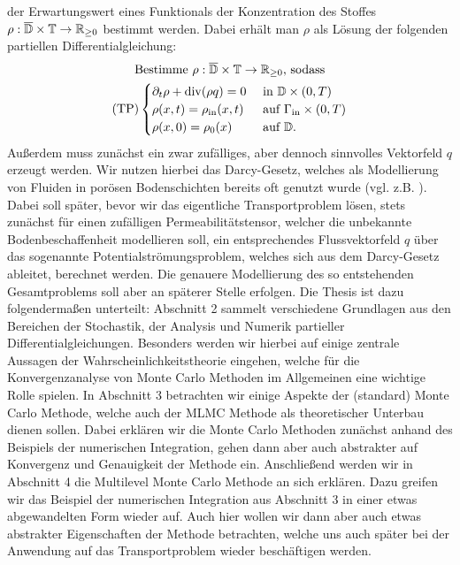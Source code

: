 der Erwartungswert eines Funktionals der  Konzentration des Stoffes $\rho: \overline{\mathbb{D}} \times \mathbb{T}  \rightarrow \mathbb{R}_{\geq0}$ bestimmt werden. Dabei erhält man $\rho$ als Lösung der folgenden partiellen Differentialgleichung:
\begin{gather*}
\text{Bestimme } \rho: \overline{\mathbb{D}} \times \mathbb{T} \to \mathbb{R}_{\geq 0} \text{, sodass}\\
(\text{TP})
\begin{cases}
\partial_t \rho + \operatorname{div}(\rho q) = 0 &\text{ in } \mathbb{D} \times (0,T)\\
\rho(x,t) = \rho_{\text{in}}(x,t) &\text{ auf } \Gamma_{\text{in}} \times (0,T)\\
\rho(x,0) = \rho_0(x) &\text{ auf } \mathbb{D}.
\end{cases}
\end{gather*}
Außerdem muss zunächst ein zwar zufälliges, aber dennoch sinnvolles Vektorfeld $q$ erzeugt werden. Wir nutzen hierbei das Darcy-Gesetz, welches als Modellierung von Fluiden in porösen Bodenschichten bereits oft genutzt wurde (vgl. z.B. \cite{de1986quantitative}).
Dabei soll später, bevor wir das eigentliche Transportproblem lösen, stets zunächst für einen zufälligen Permeabilitätstensor, welcher die unbekannte Bodenbeschaffenheit modellieren soll, ein entsprechendes Flussvektorfeld $q$ über das sogenannte Potentialströmungsproblem, welches sich aus dem Darcy-Gesetz ableitet, berechnet werden. 
Die genauere Modellierung des so entstehenden Gesamtproblems soll aber an späterer Stelle erfolgen. \newline
Die Thesis ist dazu folgendermaßen unterteilt:\newline 
Abschnitt 2 sammelt verschiedene Grundlagen aus den Bereichen der Stochastik, der Analysis und Numerik partieller Differentialgleichungen. Besonders werden wir hierbei auf einige zentrale Aussagen der Wahrscheinlichkeitstheorie eingehen, welche für die Konvergenzanalyse von Monte Carlo Methoden im Allgemeinen eine wichtige Rolle spielen. 
In Abschnitt 3 betrachten wir einige Aspekte der (standard) Monte Carlo Methode, welche auch der MLMC Methode als theoretischer Unterbau dienen sollen. Dabei erklären wir die Monte Carlo Methoden zunächst anhand des Beispiels der numerischen Integration, gehen dann aber auch abstrakter auf Konvergenz und Genauigkeit der Methode ein.  \newline
Anschließend werden wir in Abschnitt 4 die Multilevel Monte Carlo Methode an sich erklären.
Dazu greifen wir das Beispiel der numerischen Integration aus Abschnitt 3 in einer etwas abgewandelten Form wieder auf. Auch hier wollen wir dann aber auch etwas abstrakter Eigenschaften der Methode betrachten, welche uns auch später bei der Anwendung auf das Transportproblem wieder beschäftigen werden. \newline
